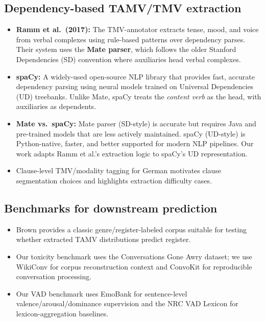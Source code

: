\documentclass[11pt]{article}
\begin{document}
\subsection{Dependency-based TAMV/TMV extraction}
\begin{itemize}
  \item \textbf{Ramm et al.\ (2017):} The TMV-annotator extracts tense, mood, and voice from verbal complexes using rule-based patterns over dependency parses. Their system uses the \textbf{Mate parser}, which follows the older Stanford Dependencies (SD) convention where auxiliaries head verbal complexes. \citep{Ramm2017AnnotatingGerman}
  \item \textbf{spaCy:} A widely-used open-source NLP library that provides fast, accurate dependency parsing using neural models trained on Universal Dependencies (UD) treebanks. Unlike Mate, spaCy treats the \emph{content verb} as the head, with auxiliaries as dependents. \citep{Okhapkin2021ConstructingLibraries}
  \item \textbf{Mate vs.\ spaCy:} Mate parser (SD-style) is accurate but requires Java and pre-trained models that are less actively maintained. spaCy (UD-style) is Python-native, faster, and better supported for modern NLP pipelines. Our work adapts Ramm et al.'s extraction logic to spaCy's UD representation.
  \item Clause-level TMV/modality tagging for German motivates clause segmentation choices and highlights extraction difficulty cases. \citep{DonickeClause-LevelGerman}
\end{itemize}

\subsection{Benchmarks for downstream prediction}
\begin{itemize}
  \item Brown provides a classic genre/register-labeled corpus suitable for testing whether extracted TAMV distributions predict register. \citep{19684/682R15.00.}
  \item Our toxicity benchmark uses the Conversations Gone Awry dataset; we use WikiConv for corpus reconstruction context and ConvoKit for reproducible conversation processing. \citep{Zhang2018ConversationsFailure,Hua2018WikiConv:Community,Chang2020ConvoKit:Conversations}
  \item Our VAD benchmark uses EmoBank for sentence-level valence/arousal/dominance supervision and the NRC VAD Lexicon for lexicon-aggregation baselines. \citep{Buechel2017EmoBank:Analysis,Mohammad2018ObtainingWords}
\end{itemize}
\end{document}
